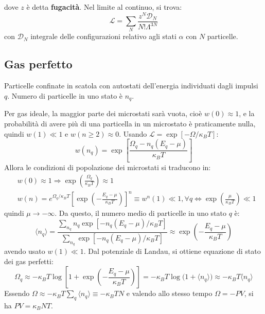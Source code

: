 \documentclass[10pt, a4paper]{scrartcl}
\numberwithin{equation}{subsection}
\theoremstyle{style1}
\theoremstyle{style2}
\begin{document}
dove $z$ \`e detta \textbf{fugacit\`a}. Nel limite al continuo, si trova:
\begin{equation}
	\mathscr{L}= \sum_{N}^{} \frac{z^N \mathscr{D}_N}{N! \Lambda ^{3N} }
\end{equation}
con $\mathscr{D}_N$ integrale delle configurazioni relativo agli stati $\alpha $ con $N$ particelle.


\subsection{Gas perfetto}
Particelle confinate in scatola con autostati dell'energia individuati dagli impulsi $q$. Numero di particelle in uno stato \`e $n_q$. 

Per gas ideale, la maggior parte dei microstati sar\`a vuota, cio\`e $w(0) \approx 1$, e la probabilit\`a di avere pi\`u di una particella in un microstato \`e praticamente nulla, quindi $w(1) \ll 1$ e $w(n\ge 2) \approx 0$. Usando $\mathscr{L} = \exp \left[ - \Omega / \kappa _B T \right] $:
\begin{equation}
	w(n_q) = \exp \left[ \frac{\Omega _q - n_q (E_q - \mu )}{\kappa _B T} \right] 
\end{equation}
Allora le condizioni di popolazione dei microstati si traducono in:
\begin{equation}
	\begin{split}
		&w(0) \approx 1 \Rightarrow \exp \left(\frac{\Omega _q}{\kappa _B T}\right) \approx 1\\
		&w(n) = e^{\Omega _q / \kappa _B T} \left[\exp \left(- \frac{E_q - \mu }{\kappa _BT} \right)\right]  ^n\equiv w^n(1)  \ll 1, \forall q \iff \exp \left(\frac{\mu}{\kappa _BT }\right) \ll 1
	\end{split}
\end{equation}
quindi $\mu \to -\infty$. Da questo, il numero medio di particelle in uno stato $q$ \`e:
\begin{equation}
	\langle n_q \rangle = \frac{\sum_{n_q}^{} n_q \exp\left[ -n_q (E_q - \mu ) / \kappa _BT \right] }{\sum_{n_q}^{}\exp\left[ -n_q (E_q - \mu ) / \kappa _BT \right]  } \approx \exp \left(- \frac{E_q - \mu }{\kappa _BT }\right) 
\end{equation}
avendo usato $w(1) \ll 1$. Dal potenziale di Landau, si ottiene equazione di stato dei gas perfetti:
\[
\Omega _q \approx -\kappa _B T \log \left[ 1 + \exp\left(- \frac{E_q - \mu }{\kappa _B T }\right)  \right] = -\kappa _B T \log \Big(1 + \langle n_q \rangle\Big) \approx -\kappa _B T \langle n_q \rangle
\] 
Essendo $\Omega \approx - \kappa _B T \sum_{q}^{} \langle n_q \rangle  \equiv -\kappa _B T N$ e valendo allo stesso tempo $\Omega = - PV$, si ha $PV = \kappa _B NT$.
\end{document}
